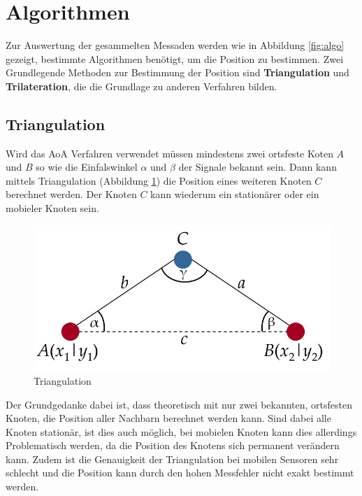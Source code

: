 \section{Algorithmen}
\label{sec:algorithmen}

Zur Auswertung der gesammelten Messaden werden wie in Abbildung
\ref{fig:algo} gezeigt, bestimmte Algorithmen benötigt, um die
Position zu bestimmen. Zwei Grundlegende Methoden zur Bestimmung der
Position sind \textbf{Triangulation} und \textbf{Trilateration}, die
die Grundlage zu anderen Verfahren bilden.


\subsection{Triangulation}

Wird das \ac{AoA} Verfahren verwendet müssen mindestens zwei ortsfeste
Koten $A$ und $B$ so wie die Einfalswinkel $\alpha$ und $\beta$ der
Signale bekannt sein. Dann kann mittels Triangulation (Abbildung
\ref{fig:triang}) die Position eines weiteren Knoten $C$ berechnet
werden. Der Knoten $C$ kann wiederum ein stationärer oder ein mobieler
Knoten sein.

\begin{figure}[h!]
  \centering
  \includegraphics[scale=0.3]{img/triang}

  \caption{Triangulation}
  \label{fig:triang}
\end{figure}

Der Grundgedanke dabei ist, dass theoretisch mit nur zwei bekannten,
ortsfesten Knoten, die Position aller Nachbarn berechnet werden kann.
Sind dabei alle Knoten stationär, ist dies auch möglich, bei mobielen
Knoten kann dies allerdings Problematisch werden, da die Position des
Knotens sich permanent verändern kann. Zudem ist die Genauigkeit der
Triangulation bei mobilen Sensoren sehr schlecht und die Position kann
durch den hohen Messfehler nicht exakt bestimmt werden.
\cite{roehrig2009} 

